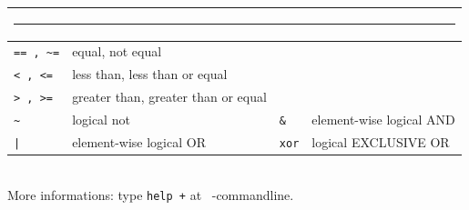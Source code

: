 \clearpage
{}\vspace*{-0.2cm}
$\phantom{x}$

\begin{tabular}{llll}
\multicolumn{4}{c}{\rule{0.97\textwidth}{0pt}}\\[-2ex]\hline
\verb(== , ~=( & equal, not equal\\
\verb(< , <=( & less than, less than or equal\\
\verb(> , >=( & greater than, greater than or equal\\
\hline
\verb/~/ & logical not & \verb/&/ & element-wise logical AND\\
\verb/|/ & element-wise logical OR & \verb/xor/ & logical EXCLUSIVE OR\\
\hline
\end{tabular}\\
More informations: type \verb/help +/ at \matl\ -commandline.

\vspace*{-0.2cm}
$\phantom{x}$

